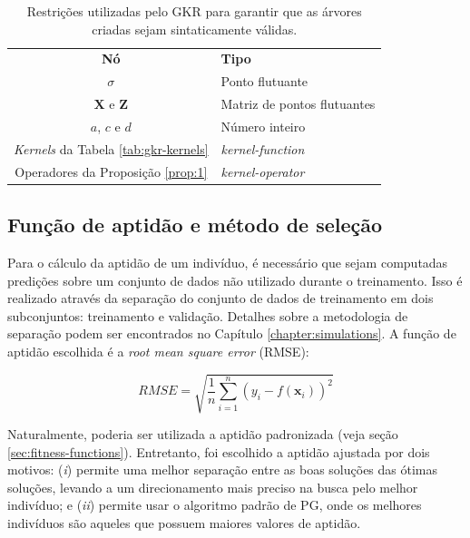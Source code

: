 \begin{table}[H]
    \caption{Restrições utilizadas pelo GKR para garantir que as árvores criadas sejam sintaticamente válidas.}
    \begin{center} \label{tab:stgp-constraints}
        \begin{tabular}{C@{\hskip 15pt}l}
            \hline\noalign{\smallskip}
            \textbf{Nó} & \textbf{Tipo} \\
            \noalign{\smallskip}
            \hline
            \noalign{\smallskip}
            $\sigma$ & Ponto flutuante \\
            $\mathbf{X}$ e $\mathbf{Z}$ & Matriz de pontos flutuantes \\
            $a$, $c$ e $d$ & Número inteiro \\
            \textit{Kernels} da Tabela \ref{tab:gkr-kernels} & \textit{kernel-function} \\
            Operadores da Proposição \ref{prop:1} & \textit{kernel-operator} \\
            \hline
        \end{tabular}
    \end{center}
    \begin{center}
    \end{center}
\end{table}

\subsection{Função de aptidão e método de seleção}
Para o cálculo da aptidão de um indivíduo, é necessário que sejam computadas predições sobre um conjunto de dados não utilizado durante o treinamento. Isso é realizado através da separação do conjunto de dados de treinamento em dois subconjuntos: treinamento e validação. Detalhes sobre a metodologia de separação podem ser encontrados no Capítulo \ref{chapter:simulations}. A função de aptidão escolhida é a \textit{root mean square error} (RMSE):

\begin{equation}
    \label{ch3:eq29}
    RMSE = \sqrt{\frac{1}{n}\sum_{i=1}^{n}{(y_i - f(\mathbf{x}_i))^2}}
\end{equation}

Naturalmente, poderia ser utilizada a aptidão padronizada (veja seção \ref{sec:fitness-functions}). Entretanto, foi escolhido a aptidão ajustada por dois motivos: (\textit{i}) permite uma melhor separação entre as boas soluções das ótimas soluções, levando a um direcionamento mais preciso na busca pelo melhor indivíduo; e (\textit{ii}) permite usar o algoritmo padrão de PG, onde os melhores indivíduos são aqueles que possuem maiores valores de aptidão.

